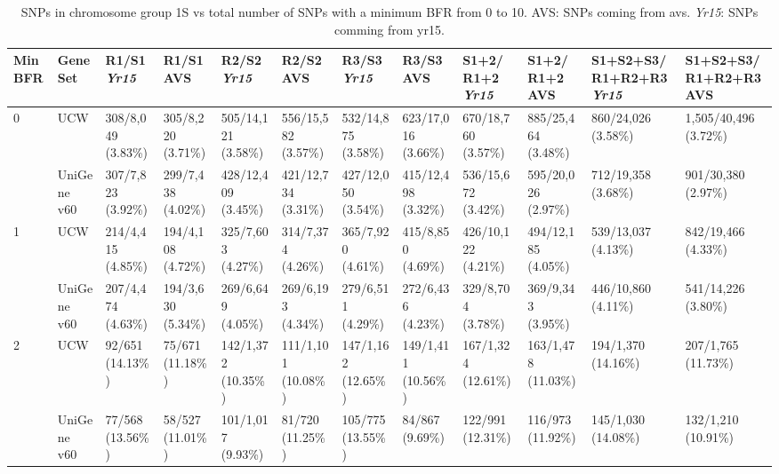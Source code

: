 \begin{sidewaystable}
\caption{ SNPs in chromosome group 1S vs total number of SNPs with a minimum BFR from 0 to 10. AVS: SNPs coming from \acrlong{avs}. \textit{Yr15}: SNPs comming from \acrlong{yr15}. }
\centering
\label{app:yr15:bfrThresholds}
\begin{localsize}{6}{7}

\begin{tabular}{llp{1cm}p{1cm}p{1cm}p{1cm}p{1cm}p{1cm}p{1cm}p{1cm}p{1cm}p{1cm}}
\toprule
 Min  BFR   & Gene Set    & R1/S1 \textit{Yr15}        & R1/S1 AVS         & R2/S2 \textit{Yr15}         & R2/S2 AVS          & R3/S3 \textit{Yr15}         & R3/S3 AVS          & S1+2/ R1+2 \textit{Yr15}    & S1+2/ R1+2 AVS     & S1+S2+S3/ R1+R2+R3 \textit{Yr15}   & S1+S2+S3/ R1+R2+R3 AVS   \\
\midrule
 0          & UCW         & 308/8,049 (3.83\%) & 305/8,220 (3.71\%) & 505/14,121 (3.58\%) & 556/15,582 (3.57\%) & 532/14,875 (3.58\%) & 623/17,016 (3.66\%) & 670/18,760 (3.57\%) & 885/25,464 (3.48\%) & 860/24,026 (3.58\%)        & 1,505/40,496 (3.72\%)     \\
            & UniGene v60 & 307/7,823 (3.92\%) & 299/7,438 (4.02\%) & 428/12,409 (3.45\%) & 421/12,734 (3.31\%) & 427/12,050 (3.54\%) & 415/12,498 (3.32\%) & 536/15,672 (3.42\%) & 595/20,026 (2.97\%) & 712/19,358 (3.68\%)        & 901/30,380 (2.97\%)       \\
 \midrule
 1          & UCW         & 214/4,415 (4.85\%) & 194/4,108 (4.72\%) & 325/7,603 (4.27\%)  & 314/7,374 (4.26\%)  & 365/7,920 (4.61\%)  & 415/8,850 (4.69\%)  & 426/10,122 (4.21\%) & 494/12,185 (4.05\%) & 539/13,037 (4.13\%)        & 842/19,466 (4.33\%)       \\
            & UniGene v60 & 207/4,474 (4.63\%) & 194/3,630 (5.34\%) & 269/6,649 (4.05\%)  & 269/6,193 (4.34\%)  & 279/6,511 (4.29\%)  & 272/6,436 (4.23\%)  & 329/8,704 (3.78\%)  & 369/9,343 (3.95\%)  & 446/10,860 (4.11\%)        & 541/14,226 (3.80\%)       \\
 \midrule
 2          & UCW         & 92/651 (14.13\%)   & 75/671 (11.18\%)   & 142/1,372 (10.35\%) & 111/1,101 (10.08\%) & 147/1,162 (12.65\%) & 149/1,411 (10.56\%) & 167/1,324 (12.61\%) & 163/1,478 (11.03\%) & 194/1,370 (14.16\%)        & 207/1,765 (11.73\%)       \\
            & UniGene v60 & 77/568 (13.56\%)   & 58/527 (11.01\%)   & 101/1,017 (9.93\%)  & 81/720 (11.25\%)    & 105/775 (13.55\%)   & 84/867 (9.69\%)     & 122/991 (12.31\%)   & 116/973 (11.92\%)   & 145/1,030 (14.08\%)        & 132/1,210 (10.91\%)       \\

\end{tabular}
\end{localsize}
\end{sidewaystable}
